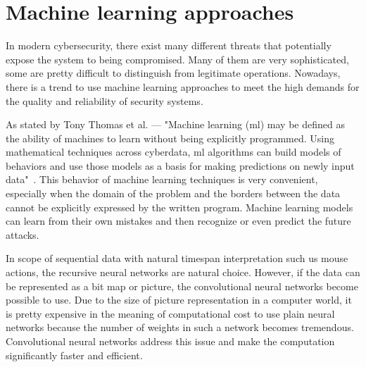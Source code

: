 \section{Machine learning approaches}\label{sec:machine-learning-approaches}
In modern cybersecurity, there exist many different threats that potentially expose the system to being compromised.
Many of them are very sophisticated, some are pretty difficult to distinguish from legitimate operations.
Nowadays, there is a trend to use machine learning approaches to meet the high demands for the quality and reliability of security systems.

As stated by Tony Thomas et al. --- "Machine learning (\gls{ml}) may be defined as the ability of machines to learn without being explicitly programmed.
Using mathematical techniques across cyberdata, \gls{ml} algorithms can build models of behaviors and use those models as a basis for making predictions on newly input data"~\cite{thomas2020machine}.
This behavior of machine learning techniques is very convenient, especially when the domain of the problem and the borders between the data cannot be explicitly expressed by the written program.
Machine learning models can learn from their own mistakes and then recognize or even predict the future attacks.

In scope of sequential data with natural timespan interpretation such us mouse actions, the recursive neural networks are natural choice.
However, if the data can be represented as a bit map or picture, the convolutional neural networks become possible to use.
Due to the size of picture representation in a computer world, it is pretty expensive in the meaning of computational cost to use plain neural networks because the number of weights in such a network becomes tremendous.
Convolutional neural networks address this issue and make the computation significantly faster and efficient.

